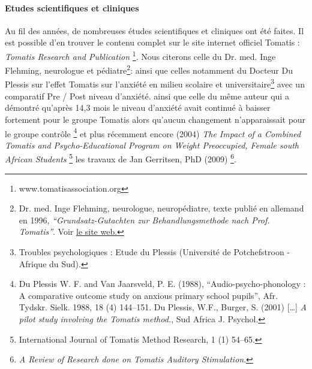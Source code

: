  \paragraph{Etudes scientifiques et cliniques}
 Au fil des années, de nombreuses études scientifiques et cliniques
 ont été faites. Il est possible d'en trouver le contenu complet sur le site
internet officiel Tomatis : \emph{Tomatis Research and Publication}  \footnote{www.tomatisassociation.org}.
 Nous citerons celle du Dr. med. Inge Flehming, neurologue et pédiatre\footnote{Dr. med. Inge Flehming,
	neurologue, neuropédiatre, texte publié en allemand
	en 1996, \emph{``Grundsatz-Gutachten zur Behandlungsmethode
		nach Prof. Tomatis''}. Voir \href{http://www.analytische-hoertherapie.de/uploads/tx\_templavoila/Grundsatzgutachten\_zur\_Behandlungsmethode\_nach\_Prof.\_Tomatis.pdf}{le site web.}}:
 ainsi que celles notamment du Docteur Du Plessis sur l'effet
Tomatis sur l'anxiété en milieu scolaire et universitaire\footnote{Troubles psychologiques : Etude du Plessis (Université de Potchefstroon
- Afrique du Sud).} avec un comparatif Pre / Post niveau d'anxiété.
ainsi que celle du même auteur qui a démontré qu'après 14,3
mois le niveau d'an\-xié\-té avait continué à baisser fortement
pour le groupe Tomatis alors qu'aucun
changement n'apparaissait pour le groupe contrôle%
\footnote{Du Plessis W. F. and Van Jaarsveld, P. E. (1988),
	``Audio-psycho-phonology : A comparative outcome study on anxious primary school pupils'',  Afr. Tydskr. Sielk. 1988,
	18 (4) 144--151. Du Plessis, W.F., Burger, S. (2001) [\ldots]
	\emph{A pilot study involving the Tomatis method.}, Sud Africa J. Psychol.}
 et plus récemment encore (2004) \emph{The Impact of a Combined
 	Tomatis and Psycho-Educational Program on Weight Preoccupied,
 	 Female south African Students}%
  \footnote{International Journal of Tomatis Method Research, 1 (1) 54--65.}  les travaux de Jan Gerritsen, PhD (2009)%
  \footnote{\emph{A Review of Research done on Tomatis Auditory Stimulation}.}.
  
 


